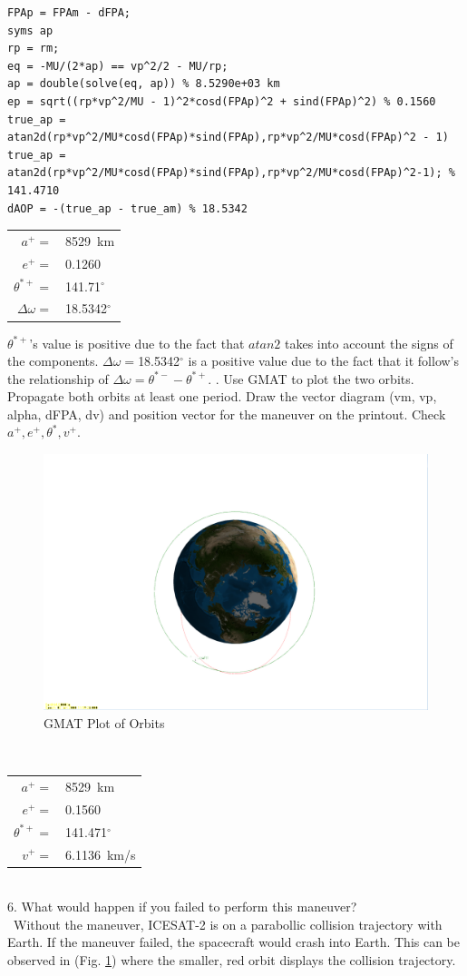\documentclass[hidelinks,12pt]{article}
\begin{document}
\begin{lstlisting}[frame=lines,style=Matlab-editor,basicstyle = \mlttfamily]
FPAp = FPAm - dFPA;
syms ap
rp = rm;
eq = -MU/(2*ap) == vp^2/2 - MU/rp;
ap = double(solve(eq, ap)) % 8.5290e+03 km
ep = sqrt((rp*vp^2/MU - 1)^2*cosd(FPAp)^2 + sind(FPAp)^2) % 0.1560
true_ap = atan2d(rp*vp^2/MU*cosd(FPAp)*sind(FPAp),rp*vp^2/MU*cosd(FPAp)^2 - 1)
true_ap = atan2d(rp*vp^2/MU*cosd(FPAp)*sind(FPAp),rp*vp^2/MU*cosd(FPAp)^2-1); % 141.4710
dAOP = -(true_ap - true_am) % 18.5342
\end{lstlisting}
\begin{tabular}{rl}
$a^+=$&8529~km\\
$e^+=$&0.1260\\
$\theta^{*+}=$&141.71$^\circ$\\
$\Delta \omega=$&18.5342$^\circ$\\
\end{tabular}
$\theta^{*+}$'s value is positive due to the fact that $atan2$ takes into account the signs of the components. $\Delta \omega=$18.5342$^\circ$ is a positive value due to the fact that it follow's the relationship of $\Delta \omega = \theta^{*-} - \theta^{*+}$.
. Use GMAT to plot the two orbits. Propagate both orbits at least one
period. Draw the vector diagram (vm, vp, alpha, dFPA, dv) and position
vector for the maneuver on the printout. Check $a^+, e^+, \theta^*, v^+$.
\begin{figure}[!htb]
  \center
  \includegraphics[scale=0.23]{Orbits}
  \caption{GMAT Plot of Orbits}
  \label{fig:GMAT}
\end{figure}\\
\begin{tabular}{rl}
$a^+=$&8529~km\\
$e^+=$&0.1560\\
$\theta^{*+}=$&141.471$^\circ$\\
$v^+=$&6.1136~km/s\\
\end{tabular}\\
\vspace{5px}
6. What would happen if you failed to perform this maneuver?\\
~Without the maneuver, ICESAT-2 is on a parabollic collision trajectory with Earth. If the maneuver failed, the spacecraft would crash into Earth. This can be observed in (Fig. \ref{fig:GMAT}) where the smaller, red orbit displays the collision trajectory.
\newpage

\end{document}

